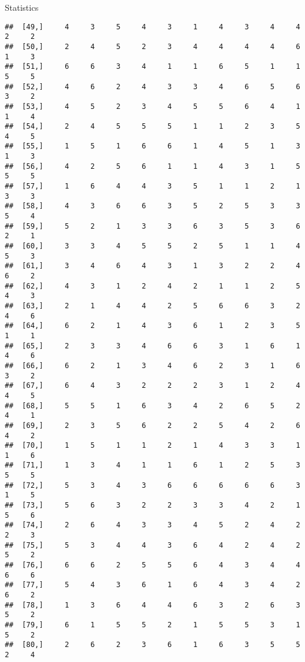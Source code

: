 \documentclass[
  ignorenonframetext,
]{beamer}
\begin{document}
\begin{frame}[fragile]{Statistics}
\begin{verbatim}
##  [49,]     4     3     5     4     3     1     4     3     4     4     2     2
##  [50,]     2     4     5     2     3     4     4     4     4     6     1     3
##  [51,]     6     6     3     4     1     1     6     5     1     1     5     5
##  [52,]     4     6     2     4     3     3     4     6     5     6     3     2
##  [53,]     4     5     2     3     4     5     5     6     4     1     1     4
##  [54,]     2     4     5     5     5     1     1     2     3     5     4     5
##  [55,]     1     5     1     6     6     1     4     5     1     3     1     3
##  [56,]     4     2     5     6     1     1     4     3     1     5     5     5
##  [57,]     1     6     4     4     3     5     1     1     2     1     3     3
##  [58,]     4     3     6     6     3     5     2     5     3     3     5     4
##  [59,]     5     2     1     3     3     6     3     5     3     6     2     1
##  [60,]     3     3     4     5     5     2     5     1     1     4     5     3
##  [61,]     3     4     6     4     3     1     3     2     2     4     6     2
##  [62,]     4     3     1     2     4     2     1     1     2     5     4     3
##  [63,]     2     1     4     4     2     5     6     6     3     2     4     6
##  [64,]     6     2     1     4     3     6     1     2     3     5     1     1
##  [65,]     2     3     3     4     6     6     3     1     6     1     4     6
##  [66,]     6     2     1     3     4     6     2     3     1     6     3     2
##  [67,]     6     4     3     2     2     2     3     1     2     4     4     5
##  [68,]     5     5     1     6     3     4     2     6     5     2     4     1
##  [69,]     2     3     5     6     2     2     5     4     2     6     4     2
##  [70,]     1     5     1     1     2     1     4     3     3     1     1     6
##  [71,]     1     3     4     1     1     6     1     2     5     3     5     5
##  [72,]     5     3     4     3     6     6     6     6     6     3     1     5
##  [73,]     5     6     3     2     2     3     3     4     2     1     5     6
##  [74,]     2     6     4     3     3     4     5     2     4     2     2     3
##  [75,]     5     3     4     4     3     6     4     2     4     2     5     2
##  [76,]     6     6     2     5     5     6     4     3     4     4     6     6
##  [77,]     5     4     3     6     1     6     4     3     4     2     6     2
##  [78,]     1     3     6     4     4     6     3     2     6     3     5     2
##  [79,]     6     1     5     5     2     1     5     5     3     1     5     2
##  [80,]     2     6     2     3     6     1     6     3     5     5     2     4

\end{verbatim}
\end{frame}
\end{document}
